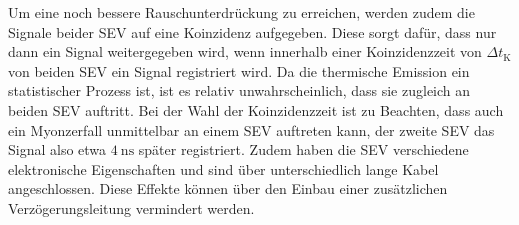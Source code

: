 Um eine noch bessere Rauschunterdrückung zu erreichen, werden zudem die Signale beider SEV auf eine Koinzidenz aufgegeben.
Diese sorgt dafür, dass nur dann ein Signal weitergegeben wird, wenn innerhalb einer Koinzidenzzeit von $\Delta t_{\mathrm{K}}$ von beiden SEV ein Signal registriert wird.
Da die thermische Emission ein statistischer Prozess ist, ist es relativ unwahrscheinlich, dass sie zugleich an beiden SEV auftritt. Bei der Wahl der Koinzidenzzeit ist zu Beachten, dass auch ein Myonzerfall unmittelbar an einem SEV auftreten kann, der zweite SEV das Signal also etwa $\SI{4}{\nano\second}$ später registriert. Zudem haben die SEV verschiedene elektronische Eigenschaften und sind über unterschiedlich lange Kabel angeschlossen.
Diese Effekte können über den Einbau einer zusätzlichen Verzögerungsleitung vermindert werden.
